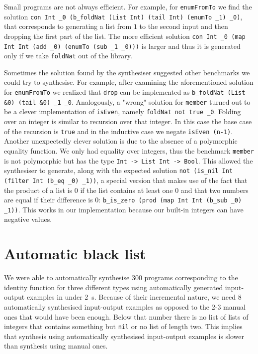 Small programs are not always efficient. For example, for \lstinline?enumFromTo? we find the solution \lstinline?con Int _0 (b_foldNat (List Int) (tail Int) (enumTo _1) _0)?, that corresponds to generating a list from $1$ to the second input and then dropping the first part of the list. The more efficient solution \lstinline?con Int _0 (map Int Int (add _0) (enumTo (sub _1 _0)))? is larger and thus it is generated only if we take \lstinline?foldNat? out of the library.

Sometimes the solution found by the synthesiser suggested other benchmarks we could try to synthesise. For example, after examining the aforementioned solution for \lstinline?enumFromTo? we realized that \lstinline?drop? can be implemented as \lstinline?b_foldNat (List &0) (tail &0) _1 _0?. Analogously, a "wrong" solution for \lstinline?member? turned out to be a clever implementation of \lstinline?isEven?, namely \lstinline?foldNat not true _0?. Folding over an integer is similar to recursion over that integer. In this case the base case of the recursion is \lstinline?true? and in the inductive case we negate \lstinline?isEven (n-1)?.\\
Another unexpectedly clever solution is due to the absence of a polymorphic equality function. We only had equality over integers, thus the benchmark \lstinline?member? is not polymorphic but has the type \lstinline?Int -> List Int -> Bool?. This allowed the synthesiser to generate, along with the expected solution \lstinline?not (is_nil Int (filter Int (b_eq _0) _1))?, a special version that makes use of the fact that the product of a list is $0$ if the list contains at least one $0$ and that two numbers are equal if their difference is $0$: \lstinline?b_is_zero (prod (map Int Int (b_sub _0) _1))?. This works in our implementation because our built-in integers can have negative values.


\section{Automatic black list}\label{Automatic black list}
We were able to automatically synthesise $300$ programs corresponding to the identity function for three different types using automatically generated input-output examples in under \SI{2}{s}. Because of their incremental nature, we need $8$ automatically synthesised input-output examples as opposed to the $2$-$3$ manual ones that would have been enough. Below that number there is no list of lists of integers that contains something but \lstinline?nil? or no list of length two. This implies that synthesis using automatically synthesised input-output examples is slower than synthesis using manual ones.

